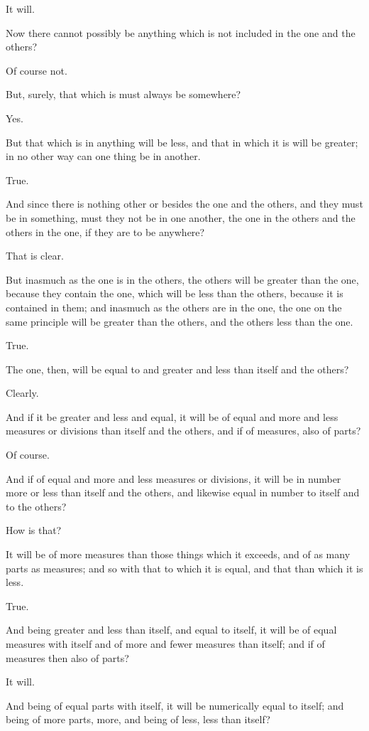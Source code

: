 It will.

Now there cannot possibly be anything which is not included in the one
and the others?

Of course not.

But, surely, that which is must always be somewhere?

Yes.

But that which is in anything will be less, and that in which it is will
be greater; in no other way can one thing be in another.

True.

And since there is nothing other or besides the one and the others, and
they must be in something, must they not be in one another, the one in
the others and the others in the one, if they are to be anywhere?

That is clear.

But inasmuch as the one is in the others, the others will be greater
than the one, because they contain the one, which will be less than the
others, because it is contained in them; and inasmuch as the others
are in the one, the one on the same principle will be greater than the
others, and the others less than the one.

True.

The one, then, will be equal to and greater and less than itself and the
others?

Clearly.

And if it be greater and less and equal, it will be of equal and more
and less measures or divisions than itself and the others, and if of
measures, also of parts?

Of course.

And if of equal and more and less measures or divisions, it will be in
number more or less than itself and the others, and likewise equal in
number to itself and to the others?

How is that?

It will be of more measures than those things which it exceeds, and of
as many parts as measures; and so with that to which it is equal, and
that than which it is less.

True.

And being greater and less than itself, and equal to itself, it will
be of equal measures with itself and of more and fewer measures than
itself; and if of measures then also of parts?

It will.

And being of equal parts with itself, it will be numerically equal to
itself; and being of more parts, more, and being of less, less than
itself?

